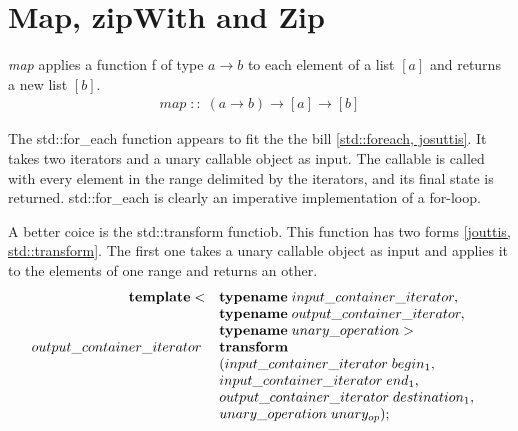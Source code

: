 \documentclass[12pt,fleqn]{article}
\begin{document}
 
%
\section*{Map, zipWith and Zip}
%
%
{\em map} applies a function f of type $a \rightarrow b$ to each element of a list $[a]$ and returns a new list $[b]$. 
\begin{eqnarray*}
map \;::\; (a \rightarrow b) \rightarrow [a] \rightarrow [b]
\end{eqnarray*}
 
The std::for\_each function appears to fit the the bill \ref{std::foreach, josuttis}.
It takes two iterators and a unary callable object as input.
The callable is called with every element in the range delimited by the iterators, and its final state is returned.
std::for\_each is clearly an imperative implementation of a for-loop.

A better coice is the std::transform functiob. 
This function has two forms \ref{jouttis, std::transform}.
The first one takes a unary callable object as input and applies it to the elements of one range and returns an other.
\[
\begin{array}{rll}
\mbox{\bf template}<&\mbox{\bf typename}\; input\_container\_iterator, \\
               &\mbox{\bf typename} \; output \_container\_iterator, \\
             &\mbox{\bf typename} \; unary\_operation >&\\
output\_container\_iterator\;& \mbox{\bf transform}\\
&( input\_container\_iterator\; begin_1, \\
& input\_container\_iterator \; end_1, \\
& output\_container\_iterator \; destination_1, \\
& unary\_operation \; unary_{op} );
\end{array}
\]
\end{document}
